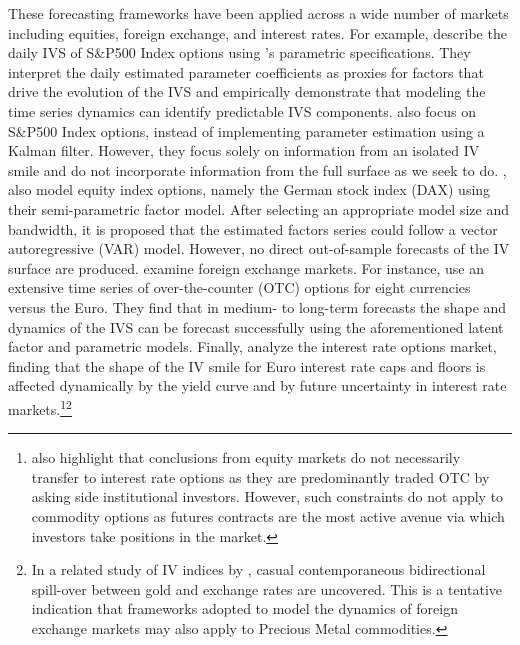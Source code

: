 \documentclass[12pt,a4paper]{article}
\newcommand\possessivecite[1]{\citeauthor{#1}'s \citeyearpar{#1}}
\begin{document}
These forecasting frameworks have been applied across a wide number of markets including equities, foreign exchange, and interest rates. For example, \cite{goncalves2006predictable} describe the daily IVS of S\&P500 Index options using \possessivecite{dumas1998implied} parametric specifications. They interpret the daily estimated parameter coefficients as proxies for factors that drive the evolution of the IVS and empirically demonstrate that modeling the time series dynamics can identify predictable IVS components. \cite{BH09} also focus on S\&P500 Index options, instead of implementing parameter estimation using a Kalman filter. However, they focus solely on information from an isolated IV smile and do not incorporate information from the full surface as we seek to do. \cite{FHM07}, also model equity index options, namely the German stock index (DAX) using their semi-parametric factor model. After selecting an appropriate model size and bandwidth, it is proposed that the estimated factors series could follow a vector autoregressive (VAR) model. However, no direct out-of-sample forecasts of the IV surface are produced. \cite{chalamandaris2010predictable, chalamandaris2011important, Chalamandaris2014} examine foreign exchange markets. For instance, \cite{Chalamandaris2014} use an extensive time series of over-the-counter (OTC) options for eight currencies versus the Euro. They find that in medium- to long-term forecasts the shape and dynamics of the IVS can be forecast successfully using the aforementioned latent factor and parametric models. Finally, \cite{deuskar2008economic} analyze the interest rate options market, finding that the shape of the IV smile for Euro interest rate caps and floors is affected dynamically by the yield curve and by future uncertainty in interest rate markets.\footnote{\noindent \cite{deuskar2008economic} also highlight that conclusions from equity markets do not necessarily transfer to interest rate options as they are predominantly traded OTC by asking side institutional investors. However, such constraints do not apply to commodity options as futures contracts are the most active avenue via which investors take positions in the market.}\footnote{\noindent In a related study of IV indices by \cite{badshah2013contemporaneous}, casual contemporaneous bidirectional spill-over between gold and exchange rates are uncovered. This is a tentative indication that frameworks adopted to model the dynamics of foreign exchange markets may also apply to Precious Metal commodities.}
\end{document}
